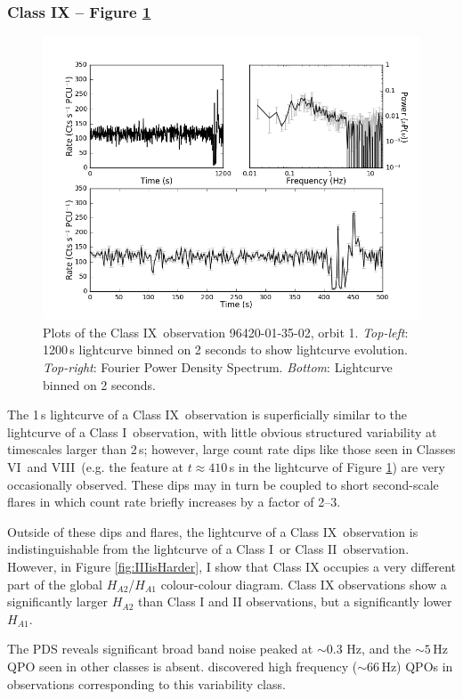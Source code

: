 \subsubsection{Class IX -- Figure \ref{fig:Qmulti}}
\label{sec:ClassIX}
\begin{figure}
    \includegraphics[width=0.8\columnwidth, trim = 0.6cm 0 3.9cm 0]{images/Qmulti.png}
    \captionsetup{singlelinecheck=off}
    \caption[Characteristic lightcurves and a power spectrum of Type IX variability.]{Plots of the Class IX\indexix\ observation 96420-01-35-02, orbit 1.  \textit{Top-left}: 1200\,s lightcurve binned on 2 seconds to show lightcurve evolution.  \textit{Top-right}: Fourier Power Density Spectrum.  \textit{Bottom}: Lightcurve binned on 2 seconds.}
   \label{fig:Qmulti}
\end{figure}

\par The 1\,s lightcurve of a Class IX\indexix\ observation is superficially similar to the lightcurve of a Class I\indexi\ observation, with little obvious structured variability at timescales larger than 2\,s; however, large count rate dips like those seen in Classes VI\indexvi\ and VIII\indexviii\ (e.g. the feature at $t\approx410$\,s in the lightcurve of Figure \ref{fig:Qmulti}) are very occasionally observed.  These dips may in turn be coupled to short second-scale flares in which count rate briefly increases by a factor of 2--3.
\par Outside of these dips and flares, the lightcurve of a Class IX\indexix\ observation is indistinguishable from the lightcurve of a Class I\indexi\ or Class II\indexii\ observation.  However, in Figure \ref{fig:IIIisHarder}, I show that Class IX occupies a very different part of the global $H_{A2}$/$H_{A1}$ colour-colour diagram.  Class IX observations show a significantly larger $H_{A2}$ than Class I and II observations, but a significantly lower $H_{A1}$.
\par The PDS reveals significant broad band noise peaked at $\sim$0.3 Hz, and the $\sim5$\,Hz QPO seen in other classes is absent.  \citet{Altamirano_HFQPO} discovered high frequency ($\sim66$\,Hz) QPOs in observations corresponding to this variability class.

